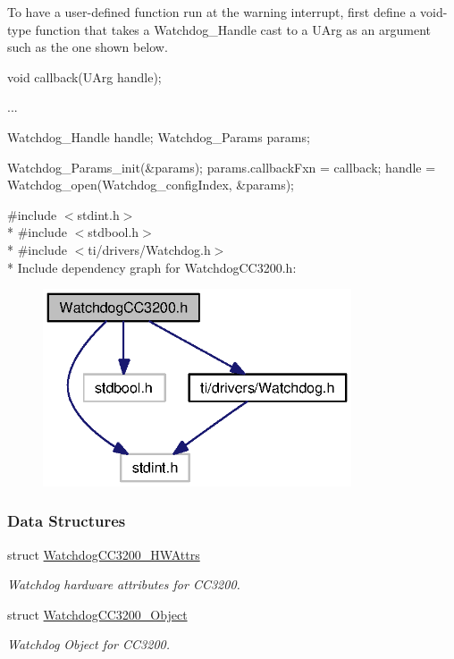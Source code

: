To have a user-\/defined function run at the warning interrupt, first define a void-\/type function that takes a Watchdog\+\_\+\+Handle cast to a U\+Arg as an argument such as the one shown below.


\begin{DoxyCode}
\textcolor{keywordtype}{void} callback(UArg handle);

...

Watchdog\_Handle handle;
Watchdog_Params params;

Watchdog_Params_init(&params);
params.callbackFxn = callback;
handle = Watchdog_open(Watchdog\_configIndex, &params);
\end{DoxyCode}


{\ttfamily \#include $<$stdint.\+h$>$}\\*
{\ttfamily \#include $<$stdbool.\+h$>$}\\*
{\ttfamily \#include $<$ti/drivers/\+Watchdog.\+h$>$}\\*
Include dependency graph for Watchdog\+C\+C3200.\+h\+:
\nopagebreak
\begin{figure}[H]
\begin{center}
\leavevmode
\includegraphics[width=259pt]{_watchdog_c_c3200_8h__incl}
\end{center}
\end{figure}
\subsubsection*{Data Structures}
\begin{DoxyCompactItemize}
\item 
struct \hyperlink{struct_watchdog_c_c3200___h_w_attrs}{Watchdog\+C\+C3200\+\_\+\+H\+W\+Attrs}
\begin{DoxyCompactList}\small\item\em Watchdog hardware attributes for C\+C3200. \end{DoxyCompactList}\item 
struct \hyperlink{struct_watchdog_c_c3200___object}{Watchdog\+C\+C3200\+\_\+\+Object}
\begin{DoxyCompactList}\small\item\em Watchdog Object for C\+C3200. \end{DoxyCompactList}\end{DoxyCompactItemize}
